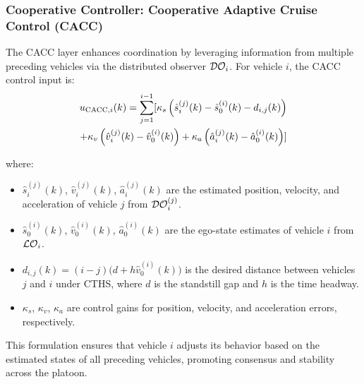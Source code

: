 \subsubsection{Cooperative Controller: Cooperative Adaptive Cruise Control (CACC)}
The CACC layer enhances coordination by leveraging information from multiple preceding vehicles via the distributed observer $\mathcal{DO}_i$. For vehicle $i$, the CACC control input is:
\begin{align}
    u_{\text{CACC},i}(k) = \sum_{j=1}^{i-1} [ \kappa_s \left( \hat{s}_i^{(j)}(k) - \hat{s}_0^{(i)}(k) - d_{i,j}(k) \right) \\ \notag +  \kappa_v \left( \hat{v}_i^{(j)}(k) -  \hat{v}_0^{(i)}(k) \right) + \kappa_a \left( \hat{a}_i^{(j)}(k) - \hat{a}_0^{(i)}(k) \right)]
\end{align}

where:
\begin{itemize}
    \item $\hat{s}_i^{(j)}(k)$, $\hat{v}_i^{(j)}(k)$, $\hat{a}_i^{(j)}(k)$ are the estimated position, velocity, and acceleration of vehicle $j$ from $\mathcal{DO}_i^{(j)}$.
    \item $\hat{s}_0^{(i)}(k)$, $\hat{v}_0^{(i)}(k)$, $\hat{a}_0^{(i)}(k)$ are the ego-state estimates of vehicle $i$ from $\mathcal{LO}_i$.
    \item $d_{i,j}(k) = (i-j)\big(d + h \hat{v}_0^{(i)}(k)\big)$ is the desired distance between vehicles $j$ and $i$ under CTHS, where $d$ is the standstill gap and $h$ is the time headway.
    \item $\kappa_s$, $\kappa_v$, $\kappa_a$ are control gains for position, velocity, and acceleration errors, respectively.
\end{itemize}
This formulation ensures that vehicle $i$ adjusts its behavior based on the estimated states of all preceding vehicles, promoting consensus and stability across the platoon.

